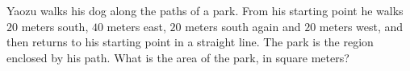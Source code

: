 Yaozu walks his dog along the paths of a park. From his starting point he walks $20$ meters south, $40$ meters east, $20$ meters south again and $20$ meters west, and then returns to his starting point in a straight line. The park is the region enclosed by his path. What is the area of the park, in square meters?
